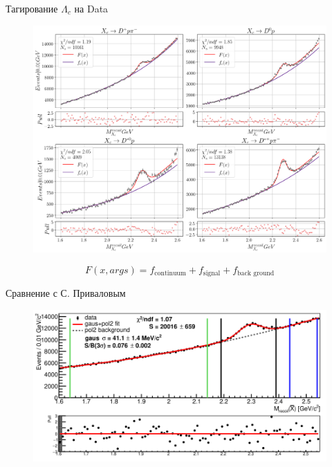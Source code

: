\documentclass{beamer}
\begin{document}
\begin{frame}{Тагирование $\Lambda_c$ на Data}
    \begin{figure}[H]
        \centering
        \includegraphics[width=0.73\linewidth]{img/fit_data.png}
    \end{figure}
    \begin{equation*}
        F(x, args) = f_{\text{continuum}} + f_{\text{signal}} + f_{\text{back ground}}
    \end{equation*}
\end{frame}

\begin{frame}{Сравнение с С. Приваловым}
    \begin{figure}[H]
        \centering
        \includegraphics[width=0.73\linewidth]{img/priv_res.png}
    \end{figure}
\end{frame}
\end{document}
